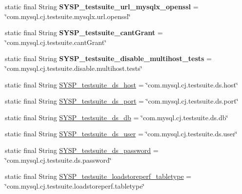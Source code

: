 \begin{DoxyCompactItemize}
static final String {\bfseries S\+Y\+S\+P\+\_\+testsuite\+\_\+url\+\_\+mysqlx\+\_\+openssl} = \char`\"{}com.\+mysql.\+cj.\+testsuite.\+mysqlx.\+url.\+openssl\char`\"{}
\item 
\mbox{\label{classcom_1_1mysql_1_1cj_1_1conf_1_1_property_definitions_a179b590076fb472d0fbf14dced590910}} 
static final String {\bfseries S\+Y\+S\+P\+\_\+testsuite\+\_\+cant\+Grant} = \char`\"{}com.\+mysql.\+cj.\+testsuite.\+cant\+Grant\char`\"{}
\item 
\mbox{\label{classcom_1_1mysql_1_1cj_1_1conf_1_1_property_definitions_a85a1aba99f66383176adcd8ec0949635}} 
static final String {\bfseries S\+Y\+S\+P\+\_\+testsuite\+\_\+disable\+\_\+multihost\+\_\+tests} = \char`\"{}com.\+mysql.\+cj.\+testsuite.\+disable.\+multihost.\+tests\char`\"{}
\item 
static final String \mbox{\hyperlink{classcom_1_1mysql_1_1cj_1_1conf_1_1_property_definitions_a86d432338d99475840565c3b46292d45}{S\+Y\+S\+P\+\_\+testsuite\+\_\+ds\+\_\+host}} = \char`\"{}com.\+mysql.\+cj.\+testsuite.\+ds.\+host\char`\"{}
\item 
static final String \mbox{\hyperlink{classcom_1_1mysql_1_1cj_1_1conf_1_1_property_definitions_a8574048752ea2217e6cba7c545012115}{S\+Y\+S\+P\+\_\+testsuite\+\_\+ds\+\_\+port}} = \char`\"{}com.\+mysql.\+cj.\+testsuite.\+ds.\+port\char`\"{}
\item 
static final String \mbox{\hyperlink{classcom_1_1mysql_1_1cj_1_1conf_1_1_property_definitions_a256636f3ea0d530350e5349db48392b6}{S\+Y\+S\+P\+\_\+testsuite\+\_\+ds\+\_\+db}} = \char`\"{}com.\+mysql.\+cj.\+testsuite.\+ds.\+db\char`\"{}
\item 
static final String \mbox{\hyperlink{classcom_1_1mysql_1_1cj_1_1conf_1_1_property_definitions_ae4cdcee271105367eda30b5c691cf988}{S\+Y\+S\+P\+\_\+testsuite\+\_\+ds\+\_\+user}} = \char`\"{}com.\+mysql.\+cj.\+testsuite.\+ds.\+user\char`\"{}
\item 
static final String \mbox{\hyperlink{classcom_1_1mysql_1_1cj_1_1conf_1_1_property_definitions_adaf6e39198f7e89b2ffeecd7a858264d}{S\+Y\+S\+P\+\_\+testsuite\+\_\+ds\+\_\+password}} = \char`\"{}com.\+mysql.\+cj.\+testsuite.\+ds.\+password\char`\"{}
\item 
static final String \mbox{\hyperlink{classcom_1_1mysql_1_1cj_1_1conf_1_1_property_definitions_aab81041451c76ee27e6153d8571b95e2}{S\+Y\+S\+P\+\_\+testsuite\+\_\+loadstoreperf\+\_\+tabletype}} = \char`\"{}com.\+mysql.\+cj.\+testsuite.\+loadstoreperf.\+tabletype\char`\"{}

\end{DoxyCompactItemize}
